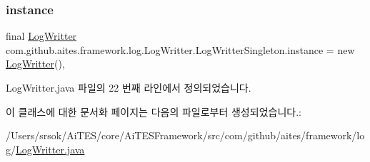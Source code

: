 \subsubsection{\texorpdfstring{instance}{instance}}
{\footnotesize\ttfamily final \mbox{\hyperlink{classcom_1_1github_1_1aites_1_1framework_1_1log_1_1_log_writter}{Log\+Writter}} com.\+github.\+aites.\+framework.\+log.\+Log\+Writter.\+Log\+Writter\+Singleton.\+instance = new \mbox{\hyperlink{classcom_1_1github_1_1aites_1_1framework_1_1log_1_1_log_writter}{Log\+Writter}}()\hspace{0.3cm}{\ttfamily [static]}, {\ttfamily [private]}}



Log\+Writter.\+java 파일의 22 번째 라인에서 정의되었습니다.



이 클래스에 대한 문서화 페이지는 다음의 파일로부터 생성되었습니다.\+:\begin{DoxyCompactItemize}
\item 
/\+Users/srsok/\+Ai\+T\+E\+S/core/\+Ai\+T\+E\+S\+Framework/src/com/github/aites/framework/log/\mbox{\hyperlink{_log_writter_8java}{Log\+Writter.\+java}}\end{DoxyCompactItemize}

